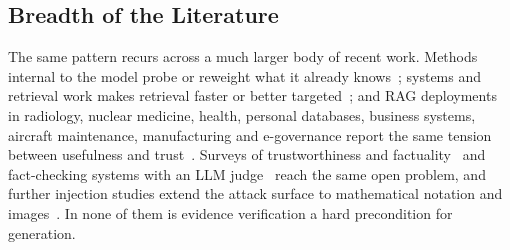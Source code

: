 \documentclass[conference]{IEEEtran}
\begin{document}
\subsection{Breadth of the Literature}
The same pattern recurs across a much larger body of recent work. Methods
internal to the model probe or reweight what it already
knows~\cite{yang2025metamorphic, li2025mixhd, liu2026isfjrag, yu2025context,
zhang2023hallucinationrobust, darwish2025multiagent, kazlaris2025taxonomy};
systems and retrieval work makes retrieval faster or better
targeted~\cite{quinn2025accelerating, macdonald2025pyterrier,
formal2024splate, wang2024topology, wu2024timesensitive, huang2024layered,
omrani2024hybrid, sun2024multimodal, peng2025graphrag, procko2024graphrag,
zhao2026aigc, james2025knowledgeassets, zhu2025llmir}; and RAG deployments
in radiology, nuclear medicine, health, personal databases, business
systems, aircraft maintenance, manufacturing and e-governance report the
same tension between usefulness and trust~\cite{fink2025radiology,
fukui2025nuclearmedicine, upadhyay2025health, byun2024interactive,
klesel2025rag, signe2025substring, knollmeyer2025documentgraphrag,
papageorgiou2025agentic}. Surveys of trustworthiness and
factuality~\cite{wang2025factuality, lin2024trustworthy,
dong2025safeguarding, huang2024safetyvv, brown2025systematic,
rahman2026hallucination, abdullahi2025hallucinationreview} and fact-checking
systems with an LLM judge~\cite{cheung2023factllama,
pendyala2024misinformation} reach the same open problem, and further
injection studies extend the attack surface to mathematical notation and
images~\cite{kwon2024mathinjection, lee2025mindmapping}. In none of them is
evidence verification a hard precondition for generation.
\end{document}
